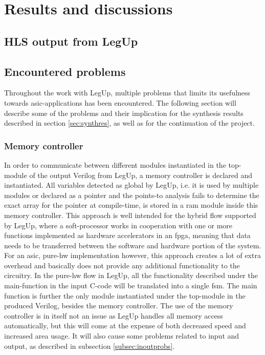 \chapter{Results and discussions}
\label{chp:resdisc}
\section{HLS output from LegUp}

\section{\label{sec:encprob}Encountered problems}
Throughout the work with LegUp, multiple problems that limits its usefulness towards \gls{asic}-applications has been encountered. The following section will describe some of the problems and their implication for the synthesis results described in section \ref{sec:synthres}, as well as for the continuation of the project.
\subsection{\label{subsec:memctrl}Memory controller}
In order to communicate between different modules instantiated in the top-module of the output Verilog from LegUp, a memory controller is declared and instantiated. All variables detected as global by LegUp, i.e. it is used by multiple modules or declared as a pointer and the points-to analysis fails to determine the exact array for the pointer at compile-time, is stored in a ram module inside this memory controller. This approach is well intended for the hybrid flow supported by LegUp, where a soft-processor works in cooperation with one or more functions implemented as hardware accelerators in an \gls{fpga}, meaning that data needs to be transferred between the software and hardware portion of the system. For an \gls{asic}, pure-\gls{hw} implementation however, this approach creates a lot of extra overhead and basically does not provide any additional functionality to the circuitry. In the pure-\gls{hw} flow in LegUp, all the functionality described under the main-function in the input C-code will be translated into a single \gls{fsm}. The main function is further the only module instantiated under the top-module in the produced Verilog, besides the memory controller. The use of the memory controller is in itself not an issue as LegUp handles all memory access automatically, but this will come at the expense of both decreased speed and increased area usage. It will also cause some problems related to input and output, as described in subsection \ref{subsec:inoutprobs}.
